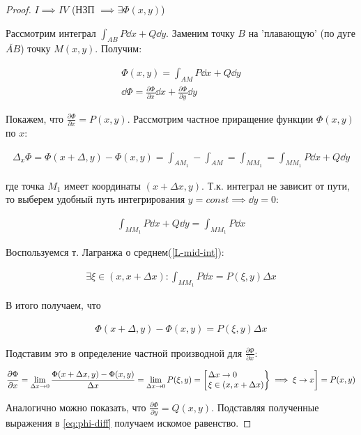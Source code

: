 \begin{proof}
  \(I \implies IV\) (НЗП \(\implies \exists \Phi(x, y)\))

  Рассмотрим интеграл \(\int_{AB} P \dd x + Q \dd y\).
  Заменим точку \(B\) на 'плавающую' (по дуге \(\breve{AB}\)) точку \(M(x, y)\).
  Получим:

  \begin{align*}
    \Phi(x, y) = \int_{AM} P \dd x + Q \dd y \\
    \dd \Phi
    = \frac{\partial \Phi}{\partial x} \dd x
      + \frac{\partial \Phi}{\partial y} \dd y
    \label{eq:phi-diff}\tag{1}
  \end{align*}

  Покажем, что \(\displaystyle \frac{\partial \Phi}{\partial x} = P(x, y)\).
  Рассмотрим частное приращение функции \(\Phi(x, y)\) по \(x\):

  \begin{align*}
    \Delta_{x} \Phi
    = \Phi(x + \Delta, y) - \Phi(x, y)
    = \int_{AM_{1}} - \int_{AM}
    = \int_{MM_{1}}
    = \int_{MM_{1}} P \dd x + Q \dd y
  \end{align*}

  где точка \(M_{1}\) имеет координаты \((x + \Delta x, y)\). Т.к. интеграл не
  зависит от пути, то выберем удобный путь интегрирования
  \(y = const \implies \dd y = 0\):

  \begin{align*}
    \int_{MM_{1}} P \dd x + Q \dd y
    = \int_{MM_{1}} P \dd x
  \end{align*}

  Воспользуемся т. Лагранжа о среднем(\ref{L-mid-int}):

  \begin{align*}
    \exists \xi \in (x, x + \Delta x) \colon 
      \int_{MM_{1}} P \dd x = P(\xi, y) \Delta x    
  \end{align*}

  В итого получаем, что
  
  \begin{align*}
    \Phi(x + \Delta, y) - \Phi(x, y) = P(\xi, y) \Delta x
  \end{align*}

  Подставим это в определение частной производной  для
  \(\displaystyle \frac{\partial \Phi}{\partial x}\):

  \begin{align*}
    \frac{\partial \Phi}{\partial x}
    = \lim_{\Delta x \to 0}
      \frac{\Phi(x + \Delta x, y) - \Phi(x, y)}{\Delta x}
    = \lim_{\Delta x \to 0} P(\xi, y)
    = \begin{bmatrix}
      \begin{rcases}
        \Delta x \to 0 \\
        \xi \in (x, x + \Delta x)
      \end{rcases}
      \implies \xi \to x
    \end{bmatrix}
    = P(x, y)
  \end{align*}

  Аналогично можно показать, что
  \(\displaystyle \frac{\partial \Phi}{\partial y} = Q(x, y)\).
  Подставляя полученные выражения в \eqref{eq:phi-diff} получаем искомое
  равенство.
\end{proof}
